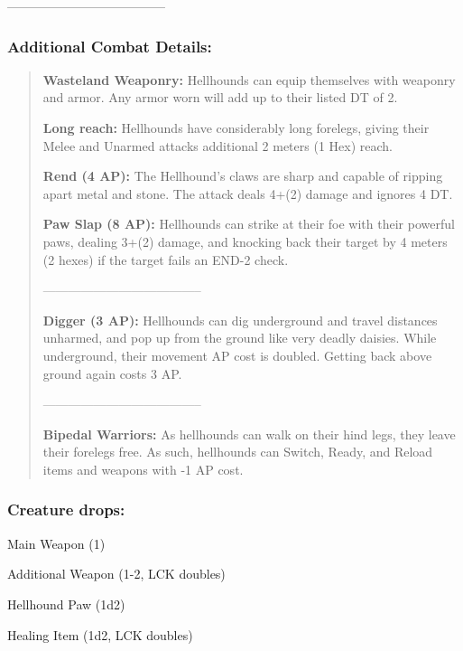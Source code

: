 \documentclass[11pt,a4paper,twocolumn]{book}
\begin{document}
	--------------------------------------
	
	\subsubsection*{Additional Combat Details:}
	\begin{verse}
		\textbf{Wasteland Weaponry:} Hellhounds can equip themselves with weaponry and armor. Any armor worn will add up to their listed DT of 2.
		
		\textbf{Long reach:} Hellhounds have considerably long forelegs, giving their Melee and Unarmed attacks additional 2 meters (1 Hex) reach.
		
		\textbf{Rend (4 AP):} The Hellhound's claws are sharp and capable of ripping apart metal and stone. The attack deals 4+(2) damage and ignores 4 DT.
		
		\textbf{Paw Slap (8 AP):} Hellhounds can strike at their foe with their powerful paws, dealing 3+(2) damage, and knocking back their target by 4 meters (2 hexes) if the target fails an END-2 check.		
		
		--------------------------------------				
		
		\textbf{Digger (3 AP):} Hellhounds can dig underground and travel distances unharmed, and pop up from the ground like very deadly daisies. While underground, their movement AP cost is doubled. Getting back above ground again costs 3 AP.
		
		--------------------------------------
		
		\textbf{Bipedal Warriors:} As hellhounds can walk on their hind legs, they leave their forelegs free. As such, hellhounds can Switch, Ready, and Reload items and weapons with -1 AP cost.
		
	\end{verse}
	
	\subsubsection*{Creature drops:}
	\begin{compactitem}
		\item Main Weapon (1)
		\item Additional Weapon (1-2, LCK doubles)
		\item Hellhound Paw (1d2)
		\item Healing Item (1d2, LCK doubles)
	\end{compactitem}
	
\end{document}
